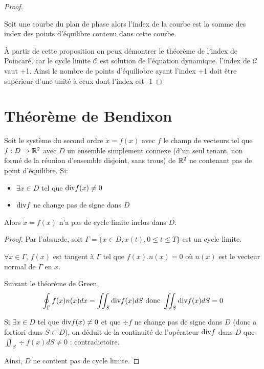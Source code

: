 \documentclass[main.tex]{subfiles}
\begin{document}
\begin{proof}~ \\
\begin{lemme}
  Soit une courbe du plan de phase alors l'index de la courbe est la somme des index des points d'équilibre contenu dans cette courbe.
\end{lemme}

À partir de cette proposition on peux démontrer le théorème de l'index de Poincaré, car le cycle limite $\mathcal{C}$ est solution de l'équation dynamique. l'index de $\mathcal{C}$ vaut +1. Ainsi le nombre de points d'équiliobre ayant l'index +1 doit être supérieur d'une unité à ceux dont l'index est -1
\end{proof}

\section{Théorème de Bendixon}

\begin{thm}
Soit le système du second ordre $\dot{x}=f(x)$ avec $f$ le champ de vecteurs tel que $f:D\rightarrow\mathbb{R}^2$ avec $D$ un ensemble simplement connexe (d'un seul tenant, non formé de la réunion d'ensemble disjoint, sans trous) de $\mathbb{R}^2$ ne contenant pas de point d'équilibre.
Si:
\begin{itemize}
\item $\exists x \in D$ tel que $\text{div} f(x) \neq 0$
\item $\text{div} f$ ne change pas de signe dans $D$
\end{itemize}
Alors $\dot{x}=f(x)$ n'a pas de cycle limite inclus dans $D$.
\end{thm}

\begin{proof}
Par l'absurde, soit $\Gamma = \{x\in D, x(t), 0 \leq t \leq T\}$ est un cycle limite.

$\forall x \in \Gamma$, $f(x)$ est tangent à $\Gamma$ tel que $f(x).n(x)=0$ où $n(x)$ est le vecteur normal de $\Gamma$ en $x$.

Suivant le théorème de Green,
\[ \oint_{\Gamma} f(x)n(x)dx = \iint_S \text{div} f(x)dS  \text{ donc } \iint_S \text{div} f(x)dS = 0
\]

Si $\exists x \in D$ tel que $\text{div} f(x) \neq 0$ et que $\div f$ ne change pas de signe dans $D$ (donc a fortiori dans $S\subset D$), on déduit de la continuité de l'opérateur $\text{div} f$ dans $D$ que $\iint_S \div f(x)dS \neq 0$ : contradictoire.

Ainsi, $D$ ne contient pas de cycle limite.
\end{proof}
\end{document}
